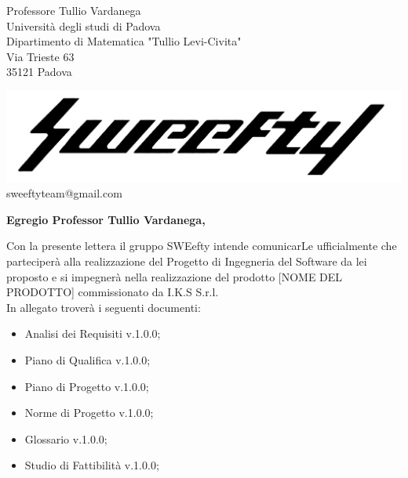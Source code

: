 \documentclass[12pt]{letter} %
\date{inseirre-la-data} %
\begin{document}



\begin{letter}{Professore Tullio Vardanega \\ Università degli studi di Padova \\ Dipartimento di Matematica "Tullio Levi-Civita" \\ Via Trieste 63 \\ 35121 Padova} %

\begin{center}
\includegraphics[width=\linewidth]{../../CommonImages/logo.jpg}
sweeftyteam@gmail.com
\end{center}

\opening{\textbf{Egregio Professor Tullio Vardanega,}}
\begin{addmargin}[2em]{2em}
  \hspace{1cm} Con la presente lettera il gruppo SWEefty intende comunicarLe ufficialmente che parteciperà alla realizzazione del Progetto di Ingegneria del Software da lei proposto e si impegnerà nella realizzazione del prodotto [NOME DEL PRODOTTO] commissionato da I.K.S S.r.l.\\
  In allegato troverà i seguenti documenti:
      \begin{itemize}
      \item Analisi dei Requisiti v.1.0.0;
      \item Piano di Qualifica v.1.0.0;
      \item Piano di Progetto v.1.0.0;
      \item Norme di Progetto v.1.0.0;
      \item Glossario v.1.0.0;
      \item Studio di Fattibilità v.1.0.0;
      \end{itemize}


\end{addmargin}
\end{letter}
\end{document}
